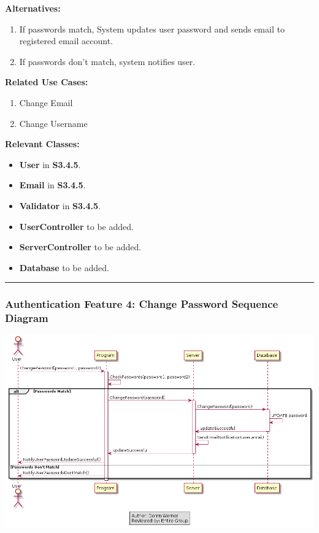 \documentclass[twoside,letterpaper]{article}
\begin{document}
\noindent\textbf{Alternatives:}
\begin{enumerate}
	\item If passwords match, System updates user password and sends email to registered email account.
	\item If passwords don't match, system notifies user.
\end{enumerate}

\noindent\textbf{Related Use Cases:}
\begin{enumerate}
	\item Change Email
	\item Change Username
\end{enumerate}

\noindent\textbf{Relevant Classes:}
\begin{itemize}
	\item \textbf{User} in \textbf{S3.4.5}.
	\item \textbf{Email} in \textbf{S3.4.5}.
	\item \textbf{Validator} in \textbf{S3.4.5}.
	\item \textbf{UserController} to be added.
	\item \textbf{ServerController} to be added.
	\item \textbf{Database} to be added.
\end{itemize}
\vspace{8pt}
\hrule
\newpage

\subsubsection[Authentication Feature 4: Change Password Sequence Diagram]{\rmfamily\bfseries\color{black}
	Authentication Feature 4: Change Password Sequence Diagram}
\hypertarget{RefHeading22059017292}{}

\bigskip

\includegraphics[width=\textwidth]{images/SequenceDiagrams/AuthenticationChangePassword}
\end{document}
